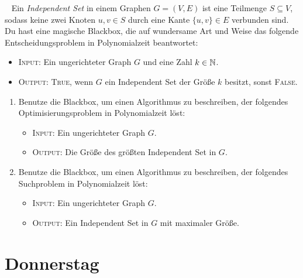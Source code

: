 \documentclass{uebung_cs}
\begin{document}
\begin{aufgabe}\
	Ein \emph{Independent Set} in einem Graphen $G = (V,E)$ ist eine Teilmenge $S \subseteq V$, sodass keine zwei Knoten $u,v \in S$ durch eine Kante $\{u,v\} \in E$ verbunden sind. Du hast eine magische Blackbox, die auf wundersame Art und Weise das folgende Entscheidungsproblem in Polynomialzeit beantwortet:
	\begin{itemize}[topsep=0.21cm, leftmargin=1.2cm]
		\item \textsc{Input}: Ein ungerichteter Graph $G$ und eine Zahl $k \in \mathbb{N}$.
		\item \textsc{Output}: \textsc{True}, wenn $G$ ein Independent Set der Größe $k$ besitzt, sonst \textsc{False}.
	\end{itemize}
	\begin{enumerate}
		\item Benutze die Blackbox, um einen Algorithmus zu beschreiben, der folgendes Optimisierungsproblem in Polynomialzeit löst:
		
		\begin{itemize}[topsep=0.21cm, leftmargin=1.2cm]
			\item \textsc{Input}: Ein ungerichteter Graph $G$.
			\item \textsc{Output}: Die Größe des größten Independent Set in $G$.
		\end{itemize}
		\item Benutze die Blackbox, um einen Algorithmus zu beschreiben, der folgendes Suchproblem in Polynomialzeit löst:
		
		\begin{itemize}[topsep=0.21cm, leftmargin=1.2cm]
			\item \textsc{Input}: Ein ungerichteter Graph $G$.
			\item \textsc{Output}: Ein Independent Set in $G$ mit maximaler Größe.
		\end{itemize}
	\end{enumerate}
\end{aufgabe}

\section*{Donnerstag}
\end{document}
